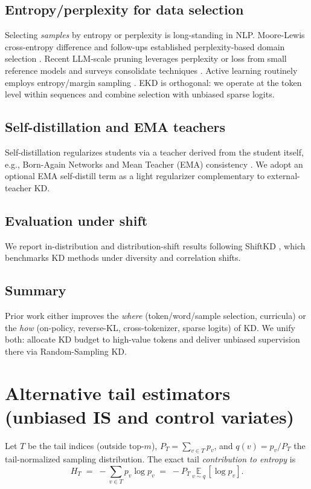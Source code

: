 \documentclass[11pt]{article}
\begin{document}

\subsection{Entropy/perplexity for data selection} Selecting \emph{samples} by entropy or perplexity is long-standing in NLP. Moore-Lewis cross-entropy difference and follow-ups established perplexity-based domain selection \citep{moore2010cediff,axelrod2015few,axelrod2017cynical}. Recent LLM-scale pruning leverages perplexity or loss from small reference models \citep{ankner2024perplexedperplexityperplexitybaseddata} and surveys consolidate techniques \citep{datasel2024survey}. Active learning routinely employs entropy/margin sampling \citep{zhang2022alsurvey}. EKD is orthogonal: we operate at the token level within sequences and combine selection with unbiased sparse logits.

\subsection{Self-distillation and EMA teachers} Self-distillation regularizes students via a teacher derived from the student itself, e.g., Born-Again Networks \citep{furlanello2018ban} and Mean Teacher (EMA) consistency \citep{tarvainen2017meanteacher}. We adopt an optional EMA self-distill term as a light regularizer complementary to external-teacher KD.

\subsection{Evaluation under shift} We report in-distribution and distribution-shift results following ShiftKD \citep{zhang2023shiftkd}, which benchmarks KD methods under diversity and correlation shifts.

\subsection{Summary} Prior work either improves the \emph{where} (token/word/sample selection, curricula) or the \emph{how} (on-policy, reverse-KL, cross-tokenizer, sparse logits) of KD. We unify both: allocate KD budget to high-value tokens and deliver unbiased supervision there via Random-Sampling KD.




\appendix
\section{Alternative tail estimators (unbiased IS and control variates)}
\label{app:tail-IS}
Let $T$ be the tail indices (outside top-$m$), $P_T=\sum_{v\in T}p_v$, and $q(v)=p_v/P_T$ the tail-normalized sampling distribution. The exact tail \emph{contribution to entropy} is
\[
	H_T \;=\; -\sum_{v\in T} p_v \log p_v \;=\; -P_T\,\underset{v\sim q}{\mathbb{E}}\,[\log p_v].
\]
\end{document}
